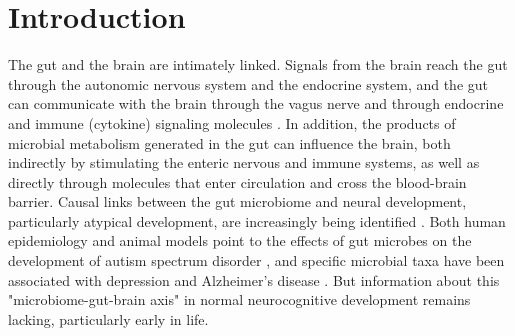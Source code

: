 \documentclass{article}
\begin{document}



\section*{Introduction}

The gut and the brain are intimately linked. Signals from the brain
reach the gut through the autonomic nervous system and the endocrine
system, and the gut can communicate with the brain through the vagus
nerve and through endocrine and immune (cytokine) signaling molecules
\cite{cerdoEarlyNutritionGut2019,pronovostPerinatalInteractionsMicrobiome2019,sharonCentralNervousSystem2016,togniniGutMicrobiotaPotential2017}.
In addition, the products of microbial metabolism generated in the gut can
influence the brain, both indirectly by stimulating the enteric nervous
and immune systems, as well as directly through molecules that enter
circulation and cross the blood-brain barrier. Causal links between the
gut microbiome and neural development, particularly atypical
development, are increasingly being identified
\cite{spichakMiningMicrobesMental2021}.
Both human epidemiology and animal models point to the effects
of gut microbes on the development of autism spectrum disorder
\cite{laueProspectiveAssociationsInfant2020,wanUnderdevelopmentGutMicrobiota2021},
and specific microbial taxa have been associated with depression
\cite{mayneris-perxachsMicrobiotaAlterationsProline2022,valles-colomerNeuroactivePotentialHuman2019}
and Alzheimer's disease
\cite{fungInteractionsMicrobiotaImmune2017,kimProbioticSupplementationImproves2021}.
But information about this "microbiome-gut-brain
axis" in normal neurocognitive development remains lacking,
particularly early in life.
\end{document}
